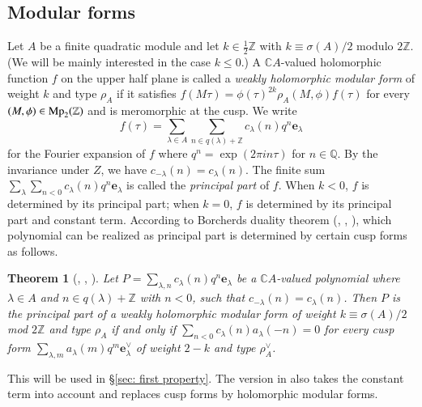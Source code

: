 \documentclass[12pt]{amsart}
\numberwithin{equation}{section}
\newtheorem{theorem}{Theorem}[section]
\theoremstyle{definition}
\theoremstyle{remark}
\newcommand{\Z}{\mathbb{Z}}
\newcommand{\Q}{\mathbb{Q}}
\newcommand{\C}{\mathbb{C}}
\newcommand{\elambda}{{\mathbf e}_{\lambda}}
\newcommand{\Mp}{{\rm Mp}_2(\mathbb{Z})}
\begin{document}
\subsection{Modular forms}\label{ssec: modular form}

Let $A$ be a finite quadratic module and 
let $k\in \frac{1}{2}{\Z}$ with $k\equiv \sigma(A)/2$ modulo $2{\Z}$. 
(We will be mainly interested in the case $k\leq 0$.) 
A $ {\C}A$-valued holomorphic function 
$f$ on the upper half plane is called a \textit{weakly holomorphic modular form} 
of weight $k$ and type $\rho_A$ if it satisfies 
$f(M\tau)=\phi(\tau)^{2k}\rho_A(M, \phi)f(\tau)$ 
for every $(M, \phi)\in {\Mp}$ 
and is meromorphic at the cusp. 
We write 
\begin{equation*}
f(\tau) = \sum_{\lambda\in A} \sum_{n\in q(\lambda)+{\Z}} c_{\lambda}(n) q^{n}{\elambda} 
\end{equation*}
for the Fourier expansion of $f$ 
where $q^n=\exp (2\pi in\tau)$ for $n\in {\Q}$. 
By the invariance under $Z$, we have 
$c_{-\lambda}(n)=c_{\lambda}(n)$. 
The finite sum 
$\sum_{\lambda} \sum_{n<0} c_{\lambda}(n) q^{n}{\elambda}$ 
is called the \textit{principal part} of $f$. 
When $k<0$, $f$ is determined by its principal part; 
when $k=0$, $f$ is determined by its principal part and constant term. 
According to Borcherds duality theorem (\cite{Bo00a}, \cite{Bo00b}, \cite{Br}), 
which polynomial can be realized as principal part 
is determined by certain cusp forms as follows. 

\begin{theorem}[\cite{Bo00a}, \cite{Bo00b}, \cite{Br}]
Let 
$P=\sum_{\lambda, n}c_{\lambda}(n)q^n{\elambda}$ 
be a ${\C}A$-valued polynomial %
where $\lambda\in A$ and $n\in q(\lambda)+{\Z}$ with $n<0$, 
such that $c_{-\lambda}(n)=c_{\lambda}(n)$. 
Then $P$ is the principal part of a weakly holomorphic modular form 
of weight $k\equiv \sigma(A)/2$ mod $2{\Z}$ and type $\rho_{A}$ 
if and only if 
$\sum_{n<0}c_{\lambda}(n)a_{\lambda}(-n)=0$ 
for every cusp form 
$\sum_{\lambda, m} a_{\lambda}(m)q^{m}\mathbf{e}_{\lambda}^{\vee}$ 
of weight $2-k$ and type $\rho_{A}^{\vee}$. 
\end{theorem}

This will be used in \S \ref{sec: first property}. 
The version in \cite{Bo00a} also takes the constant term into account 
and replaces cusp forms by holomorphic modular forms. 
\end{document}
